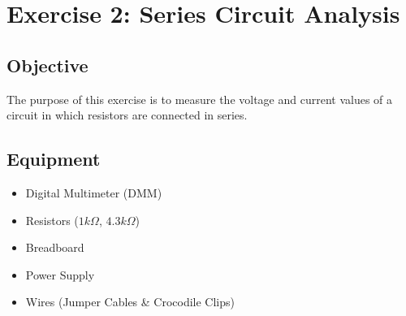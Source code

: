 \section{Exercise 2: Series Circuit Analysis}

\subsection{Objective}
The purpose of this exercise is to measure the voltage and current values of a circuit in which resistors are connected in series.

\subsection{Equipment}
\begin{itemize}
    \item Digital Multimeter (DMM)
    \item Resistors ($1k\Omega$, $4.3k\Omega$)
    \item Breadboard
    \item Power Supply
    \item Wires (Jumper Cables \& Crocodile Clips)
\end{itemize}

\newpage
\thispagestyle{plain}

